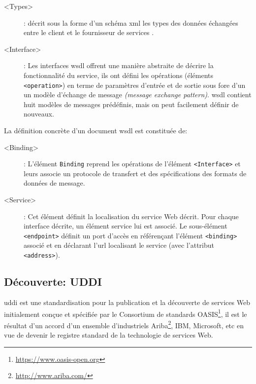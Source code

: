   \SpecialItem
  \renewcommand{\descriptionlabel}[1]{\hspace{1cm}\texttt{#1}}
  \begin{description}
  \item[<Types>]: décrit sous la forme d'un schéma \acrshort{xml} les
    types des données échangées entre le client et le fournisseur de
    services \cite{part20012}.

  \item[<Interface>]: Les interfaces \acrshort{wsdl} offrent une
    manière abstraite de décrire la fonctionnalité du service, ils ont
    défini les opérations (éléments \texttt{<operation>}) en terme de
    paramètres d'entrée et de sortie sous fore d'un un modèle
    d'échange de message \textit{(message exchange
      pattern)}. \acrshort{wsdl} contient huit modèles de messages
    prédéfinis, mais on peut facilement définir de nouveaux.
  \end{description}
  \enddescription

  La définition concrète d'un document \acrshort{wsdl} est constituée
  de:

  \SpecialItem
  \renewcommand{\descriptionlabel}[1]{\hspace{1cm}\texttt{#1}}
  \begin{description}
  \item[<Binding>]: L'élément \texttt{Binding} reprend les opérations
    de l'élément \texttt{<Interface>} et leurs associe un protocole de
    transfert et des spécifications des formats de données de message.

  \item[<Service>]: Cet élément définit la localisation du service Web
    décrit. Pour chaque interface décrite, un élément service lui est
    associé. Le sous-élément \texttt{<endpoint>} définit un port
    d’accès en référençant l'élément \texttt{<binding>} associé et en
    déclarant l'\acrshort{url} localisant le service (avec l'attribut
    \texttt{<address>}).
  \end{description}

  \subsection{Découverte: UDDI}
  \label{sec:uddi}
  \acrshort{uddi} \cite{clement2004uddi} est une standardisation pour
  la publication et la découverte de services Web initialement conçue
  et spécifiée par le Consortium de standards
  OASIS\footnote{\url{https://www.oasis-open.org}}, il est le résultat
  d'un accord d'un ensemble d'industriels
  Ariba\footnote{\url{http://www.ariba.com/}}, IBM, Microsoft, etc en
  vue de devenir le registre standard de la technologie de services
  Web.

